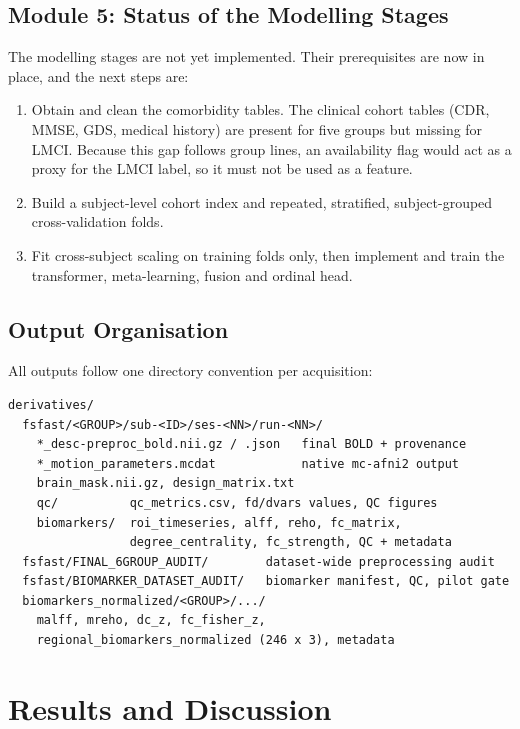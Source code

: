 \documentclass{ssnreview}
\begin{document}
\section{Module 5: Status of the Modelling Stages}
The modelling stages are not yet implemented. Their prerequisites are now in
place, and the next steps are:
\begin{enumerate}[label=\arabic*.]
  \item Obtain and clean the comorbidity tables. The clinical cohort tables (CDR, MMSE, GDS, medical history) are present
        for five groups but missing for LMCI. Because this gap follows group
        lines, an availability flag would act as a proxy for the LMCI label,
        so it must not be used as a feature.
  \item Build a subject-level cohort index and repeated, stratified,
        subject-grouped cross-validation folds.
  \item Fit cross-subject scaling on training folds only, then implement and
        train the transformer, meta-learning, fusion and ordinal head.
\end{enumerate}

\section{Output Organisation}
All outputs follow one directory convention per acquisition:
\begin{tcolorbox}[colback=gray!4, colframe=SSNBlue!40, boxrule=0.5pt, arc=2pt, fontupper=\small]
\begin{verbatim}
derivatives/
  fsfast/<GROUP>/sub-<ID>/ses-<NN>/run-<NN>/
    *_desc-preproc_bold.nii.gz / .json   final BOLD + provenance
    *_motion_parameters.mcdat            native mc-afni2 output
    brain_mask.nii.gz, design_matrix.txt
    qc/          qc_metrics.csv, fd/dvars values, QC figures
    biomarkers/  roi_timeseries, alff, reho, fc_matrix,
                 degree_centrality, fc_strength, QC + metadata
  fsfast/FINAL_6GROUP_AUDIT/        dataset-wide preprocessing audit
  fsfast/BIOMARKER_DATASET_AUDIT/   biomarker manifest, QC, pilot gate
  biomarkers_normalized/<GROUP>/.../
    malff, mreho, dc_z, fc_fisher_z,
    regional_biomarkers_normalized (246 x 3), metadata
\end{verbatim}
\end{tcolorbox}

\chapter{Results and Discussion}\label{ch:results}
\end{document}
